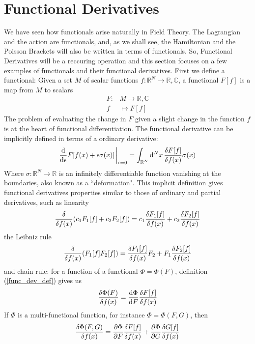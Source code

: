 \section{Functional Derivatives}
We have seen how functionals arise naturally in Field Theory. The Lagrangian and the action are functionals, and, as we shall see, the Hamiltonian and the Poisson Brackets will also be written in terms of functionals. So, Functional Derivatives will be a reccuring operation and this section focuses on a few examples of functionals and their functional derivatives. First we define a functional: Given a set $M$ of scalar functions $f:\mathbb{R}^N\to\mathbb{R},\mathbb{C}$, a functional $F[f]$ is a map from $M$ to scalars
\begin{equation}
\begin{aligned}
    F:&{M}\to\mathbb{R},\mathbb{C}\\
    f&\mapsto F[f]
\end{aligned}
\end{equation}
The problem of evaluating the change in $F$ given a slight change in the function $f$ is at the heart of functional differentiation. The functional derivative can be implicitly defined in terms of a ordinary derivative:
\begin{equation}
    \dv{\epsilon}F[f(x)+\epsilon\sigma(x)]\eval_{\epsilon=0}=\int_{\mathbb{R}^N}\dd^Nx\,\fdv{F[f]}{f(x)}\sigma(x)
    \label{func_dev_def}
\end{equation}
Where $\sigma:\mathbb{R}^N\to\mathbb{R}$ is an infinitely differentiable function vanishing at the boundaries, also known as a ``deformation". This implicit definition gives functional derivatives properties similar to those of ordinary and partial derivatives, such as linearity
\begin{equation}
    \fdv{f(x)}(c_1F_1[f]+c_2F_2[f])=c_1\fdv{F_1[f]}{f(x)}+c_2\fdv{F_2[f]}{f(x)}
\end{equation}
the Leibniz rule
\begin{equation}
    \fdv{f(x)}(F_1[f]F_2[f])=\fdv{F_1[f]}{f(x)}F_2+F_1\fdv{F_2[f]}{f(x)}
\end{equation}
and chain rule: for a function of a functional $\Phi=\Phi(F)$, definition (\ref{func_dev_def}) gives us
\begin{equation}
    \fdv{\Phi(F)}{f(x)}=\dv{\Phi}{F}\fdv{F[f]}{f(x)}
\end{equation}
If $\Phi$ is a multi-functional function, for instance $\Phi=\Phi(F,G)$, then
\begin{equation}
    \fdv{\Phi(F,G)}{f(x)}=\pdv{\Phi}{F}\fdv{F[f]}{f(x)}+\pdv{\Phi}{G}\fdv{G[f]}{f(x)}
\end{equation}

